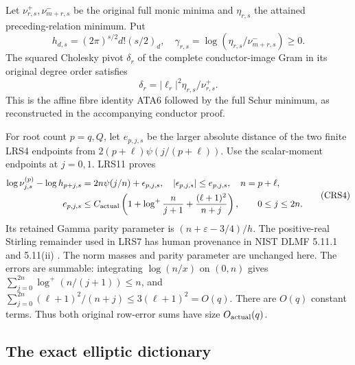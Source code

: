 Let $\nu^+_{r,s},\nu^-_{m+r,s}$ be the original full monic minima and
$\eta_{r,s}$ the attained preceding-relation minimum. Put
\[
 h_{d,s}=(2\pi)^{s/2}d!(s/2)_d,\quad
 \gamma_{r,s}=\log(\eta_{r,s}/\nu^-_{m+r,s})\ge0.
\]
The squared Cholesky pivot $\delta_r$ of the complete conductor-image
Gram in its original degree order satisfies
\[
 \delta_r=|\ell_r|^2\eta_{r,s}/\nu^+_{r,s}.             \tag{CRS3}
\]
This is the affine fibre identity ATA6 followed by the full Schur
minimum, as reconstructed in the accompanying conductor proof.

For root count $p=q,Q$, let $e_{p,j,s}$ be the larger absolute distance
of the two finite LRS4 endpoints from $2(p+\ell)\psi(j/(p+\ell))$.
Use the scalar-moment endpoints at $j=0,1$. LRS11 proves
\[
\begin{split}
 \log\nu^{(p)}_{j,s}-\log h_{p+j,s}
 &=2n\psi(j/n)+\epsilon_{p,j,s},\quad
 |\epsilon_{p,j,s}|\le e_{p,j,s},\quad n=p+\ell,\\
 e_{p,j,s}&\le C_{\rm actual}
 \left(1+\log^+\frac{n}{j+1}+\frac{(\ell+1)^2}{n+j}\right),
 \qquad 0\le j\le2n .
\end{split}                                                    \tag{CRS4}
\]
Its retained Gamma parity parameter is $(n+\varepsilon-3/4)/h$.
The positive-real Stirling remainder used in LRS7 has human provenance
in NIST DLMF 5.11.1 and 5.11(ii) \cite[\S5.11]{a02crs:crs:dlmf5}.
The norm masses and parity parameter are unchanged here.
The errors are summable: integrating $\log(n/x)$ on $(0,n)$ gives
$\sum_{j=0}^{2n}\log^+(n/(j+1))\le n$, and
$\sum_{j=0}^{2n}(\ell+1)^2/(n+j)\le3(\ell+1)^2=O(q)$.
There are $O(q)$ constant terms. Thus both original row-error sums
have size $O_{\rm actual}(q)$.

\subsection{The exact elliptic dictionary}

